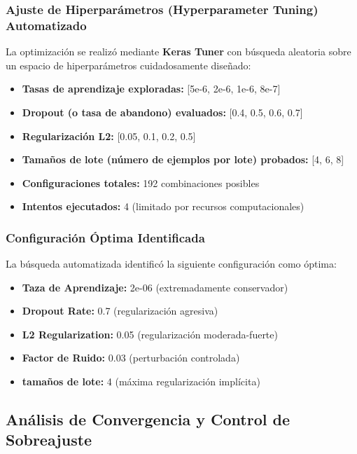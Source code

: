 \subsubsection{Ajuste de Hiperparámetros (Hyperparameter Tuning) Automatizado}

La optimización se realizó mediante \textbf{Keras Tuner} con búsqueda aleatoria sobre un espacio de hiperparámetros cuidadosamente diseñado:

\begin{itemize}
    \item \textbf{Tasas de aprendizaje exploradas:} [5e-6, 2e-6, 1e-6, 8e-7]
    \item \textbf{Dropout (o tasa de abandono) evaluados:} [0.4, 0.5, 0.6, 0.7]
    \item \textbf{Regularización L2:} [0.05, 0.1, 0.2, 0.5]
    \item \textbf{Tamaños de lote (número de ejemplos por lote) probados:} [4, 6, 8]
    \item \textbf{Configuraciones totales:} 192 combinaciones posibles
    \item \textbf{Intentos ejecutados:} 4 (limitado por recursos computacionales)
\end{itemize}

\subsubsection{Configuración Óptima Identificada}

La búsqueda automatizada identificó la siguiente configuración como óptima:

\begin{itemize}
    \item \textbf{Taza de Aprendizaje:} 2e-06 (extremadamente conservador)
    \item \textbf{Dropout Rate:} 0.7 (regularización agresiva)
    \item \textbf{L2 Regularization:} 0.05 (regularización moderada-fuerte)
    \item \textbf{Factor de Ruido:} 0.03 (perturbación controlada)
    \item \textbf{tamaños de lote:} 4 (máxima regularización implícita)
\end{itemize}

\subsection{Análisis de Convergencia y Control de Sobreajuste}
\label{subsec:convergencia_distilbert}

